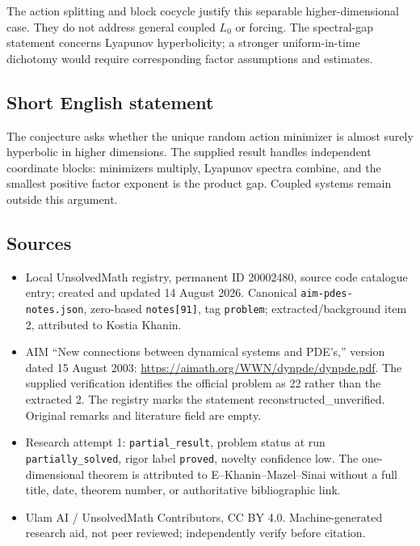 \documentclass[11pt]{article}
\begin{document}
The action splitting and block cocycle justify this separable higher-dimensional case. They do not address general coupled $L_0$ or forcing. The spectral-gap statement concerns Lyapunov hyperbolicity; a stronger uniform-in-time dichotomy would require corresponding factor assumptions and estimates.
\subsection{Short English statement}
The conjecture asks whether the unique random action minimizer is almost surely hyperbolic in higher dimensions. The supplied result handles independent coordinate blocks: minimizers multiply, Lyapunov spectra combine, and the smallest positive factor exponent is the product gap. Coupled systems remain outside this argument.
\subsection{Sources}
\begin{itemize}
\item Local UnsolvedMath registry, permanent ID 20002480, source code catalogue entry; created and updated 14 August 2026. Canonical \texttt{aim-pdes-notes.json}, zero-based \texttt{notes[91]}, tag \texttt{problem}; extracted/background item 2, attributed to Kostia Khanin.
\item AIM ``New connections between dynamical systems and PDE's,'' version dated 15 August 2003: \url{https://aimath.org/WWN/dynpde/dynpde.pdf}. The supplied verification identifies the official problem as 22 rather than the extracted 2. The registry marks the statement reconstructed\_unverified. Original remarks and literature field are empty.
\item Research attempt 1: \texttt{partial\_result}, problem status at run \texttt{partially\_solved}, rigor label \texttt{proved}, novelty confidence low. The one-dimensional theorem is attributed to E--Khanin--Mazel--Sinai without a full title, date, theorem number, or authoritative bibliographic link.
\item Ulam AI / UnsolvedMath Contributors, CC BY 4.0. Machine-generated research aid, not peer reviewed; independently verify before citation.
\end{itemize}
\end{document}
